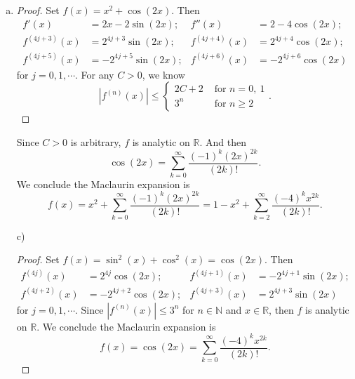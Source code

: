 \begin{Exercise}
\begin{enumerate}[a)]
\item 
\begin{proof}
Set $f(x) = x^2 + \cos(2x)$. Then 
\begin{align*}
f'(x) &= 2x - 2\sin(2x); & f''(x) &= 2-4\cos(2x);  \\
f^{(4j+3)}(x) &= 2^{4j+3}\sin(2x); & f^{(4j+4)}(x) &= 2^{4j+4}\cos(2x); \\
f^{(4j+5)}(x) &= -2^{4j+5}\sin(2x); & f^{(4j+6)}(x) &= -2^{4j+6}\cos(2x)
\end{align*}
for $j=0, 1,\cdots$. For any $C > 0$, we know 
$$|f^{(n)}(x)| \leq \begin{cases} 2C+2 & \mbox{ for } n=0,\ 1 \\
3^n & \mbox{ for } n\geq 2\end{cases}.$$
\end{proof}
Since $C>0$ is arbitrary, $f$ is analytic on $\mathbb{R}$. And then $$
\cos(2x) = \sum_{k=0}^{\infty} \frac{(-1)^k (2x)^{2k}}{(2k)!}.$$ We conclude the Maclaurin expansion is $$ f(x) = x^2 + \sum_{k=0}^{\infty} \frac{(-1)^k (2x)^{2k}}{(2k)!}
= 1-x^2 + \sum_{k=2}^{\infty} \frac{(-4)^k x^{2k}}{(2k)!}.$$

\item [c)]
\begin{proof}
Set $f(x) = \sin^2(x) + \cos^2(x) = \cos(2x)$. Then 
\begin{align*}
f^{(4j)}(x) &= 2^{4j}\cos(2x); & f^{(4j+1)}(x) &= -2^{4j+1}\sin(2x); \\
f^{(4j+2)}(x) &= -2^{4j+2}\cos(2x); & f^{(4j+3)}(x) &= 2^{4j+3}\sin(2x)
\end{align*}
for $j=0, 1,\cdots$. Since $|f^{(n)}(x)| \leq 3^n$ for $n\in\mathbb{N}$ and $x\in\mathbb{R}$, then $f$ is analytic on $\mathbb{R}$. We conclude the Maclaurin expansion is
$$ f(x) = \cos(2x) = \sum_{k=0}^{\infty} \frac{(-4)^k x^{2k}}{(2k)!}.$$
\end{proof}
\end{enumerate}
\end{Exercise}